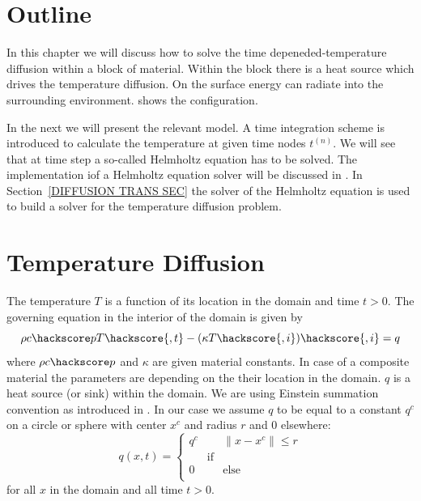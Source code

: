 \section{\label{DIFFUSION OUT SEC}Outline}
In this chapter we will discuss how to solve the time depeneded-temperature diffusion within
a block of material. Within the block there is a heat source which drives the temperature diffusion.
On the surface energy can radiate into the surrounding environment.
 shows the configuration.

In the next  we will present the relevant model. A 
time integration scheme is introduced to calculate the temperature at given time nodes $t^{(n)}$. 
We will see that at time step a so-called Helmholtz equation  has to be solved. 
The implementation iof a Helmholtz equation solver will be discussed in . 
In Section~\ref{DIFFUSION TRANS SEC} the solver of the Helmholtz equation is used to build a
solver for the temperature diffusion problem. 

\section{\label{DIFFUSION TEMP SEC}Temperature Diffusion}

The temperature $T$ is a function of its location in the domain and time $t>0$. The governing equation
in the interior of the domain is given by
\begin{equation}
\rho c\hackscore p T\hackscore{,t} - (\kappa T\hackscore{,i})\hackscore{,i} = q
\label{DIFFUSION TEMP EQ 1}
\end{equation}
where $\rho c\hackscore p$ and $\kappa$ are given material constants. In case of a composite
material the parameters are depending on the their location in the domain. $q$ is
a heat source (or sink) within the domain. We are using Einstein summation convention  
as introduced in . In our case we assume $q$ to be equal to a constant $q^{c}$
on a circle or sphere with center $x^c$ and radius $r$ and $0$ elsewhere:
\begin{equation}
q(x,t)=
\left\{ 
\begin{array}{lcl}
q^c  & & \|x-x^c\| \le r \\
     & \mbox{if} \\
0    &  & \mbox{else} \\
\end{array}
\right.
\label{DIFFUSION TEMP EQ 1b}
\end{equation}
for all $x$ in the domain and all time  $t>0$.

